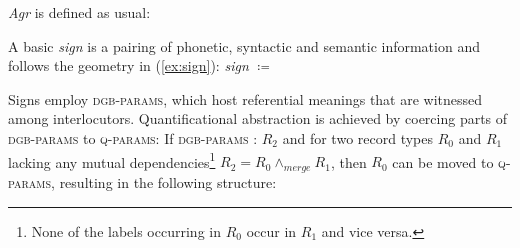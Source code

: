 \documentclass[output=paper
	        ,collection
	        ,collectionchapter
 	        ,biblatex
                ,babelshorthands
                ,newtxmath
                ,draftmode
                ,colorlinks, citecolor=brown
]{langscibook}
\begin{document}
\emph{Agr} is defined as usual:
%
\ea
{}
\z 



A basic \emph{sign} is a pairing of phonetic, syntactic and semantic information and follows the geometry in (\ref{ex:sign}): 
%
\ea \label{ex:sign}
\emph{sign} $\coloneqq$ 
\z

Signs employ \textsc{dgb-params}, which host referential meanings that are witnessed among interlocutors. 
%
Quantificational abstraction is achieved by coercing parts of \textsc{dgb-params} to \textsc{q-params}:
%
\ea
If \textsc{dgb-params} : $R_2$ and for two record types $R_0$ and $R_1$ lacking any mutual dependencies\footnote{None of the labels occurring in $R_0$ occur in $R_1$ and vice versa.}
$R_2 = R_0 \wedge_{merge} R_1$,
then $R_0$ can be moved to \textsc{q-params}, resulting in the following structure: \par\medskip 
 
\end{document}
